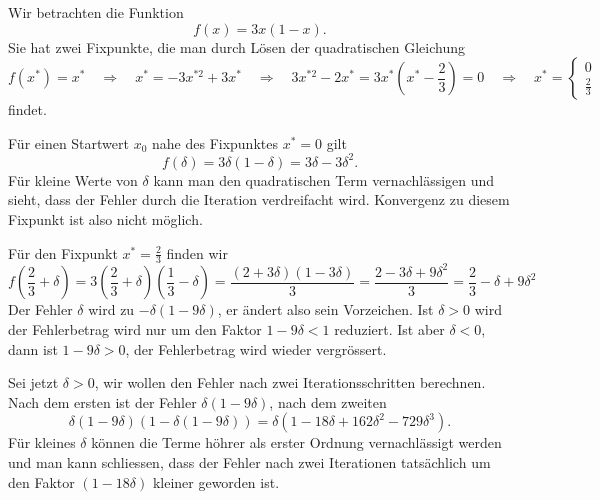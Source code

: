 \begin{beispiel}
\label{buch:beispiel:logistisch3}
Wir betrachten die Funktion
\[
f(x) = 3x(1-x).
\]
%
Sie hat zwei Fixpunkte, die man durch Lösen der quadratischen
Gleichung
%
\[
f(x^*)=x^*
\quad\Rightarrow\quad
x^*=-3x^{*2}+3x^*
\quad\Rightarrow\quad
3x^{*2}-2x^*=3x^*(x^*-{\textstyle\frac23})=0
\quad\Rightarrow\quad
x^*=
\begin{cases}
0      &\\
\frac23&
\end{cases}
\]
findet.

Für einen Startwert $x_0$ nahe des Fixpunktes $x^*=0$ gilt
\[
f(\delta)
=
3\delta(1-\delta)
=
3\delta - 3\delta^2.
\]
Für kleine Werte von $\delta$ kann man den quadratischen Term vernachlässigen
und sieht, dass der Fehler durch die Iteration verdreifacht wird.
Konvergenz zu diesem Fixpunkt ist also nicht möglich.

Für den Fixpunkt $x^* = \frac23$ finden wir
\begin{equation}
f({\textstyle\frac23}+\delta)
=
3({\textstyle\frac23}+\delta)({\textstyle\frac13}-\delta)
=
\frac{(2+3\delta)(1-3\delta)}3
=
\frac{2-3\delta+9\delta^2}{3}
=
\frac23 - \delta  + 9\delta^2
\label{buch:equation:logistic3error}
\end{equation}
Der Fehler $\delta$ wird zu $ -\delta(1-9\delta) $, er ändert also sein
Vorzeichen.
%
Ist $\delta>0$ wird der Fehlerbetrag wird nur um den Faktor $1-9\delta < 1$
reduziert.
Ist aber $\delta <0$, dann ist $1-9\delta>0$, der Fehlerbetrag wird wieder
vergrössert.

Sei jetzt $\delta>0$, wir wollen den Fehler nach zwei Iterationsschritten
berechnen.
Nach dem ersten ist der Fehler $\delta(1-9\delta)$, nach dem zweiten
\[
\delta(1-9\delta)(1-\delta(1-9\delta))
=
\delta(1-18\delta + 162\delta^2-729\delta^3).
\]
Für kleines $\delta$ können die Terme höhrer als erster Ordnung
vernachlässigt werden und man kann schliessen, dass der Fehler nach
zwei Iterationen tatsächlich um den Faktor $(1-18\delta)$ kleiner
geworden ist.


\end{beispiel}
